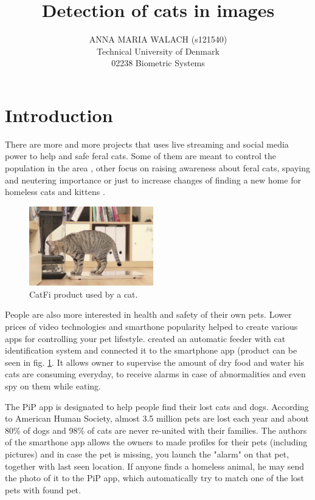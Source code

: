 \documentclass[hyperref]{acmtrans2e}
\title{Detection of cats in images}
\author{ANNA MARIA WALACH (s121540) \\Technical University of Denmark\\02238 Biometric Systems}
\begin{document}
\setcounter{page}{111}

\maketitle

\section{Introduction}
There are more and more projects that uses live streaming and social media power to help and safe feral cats. Some of them are meant to control the population in the area \cite{LAPS:2015}, other focus on raising awareness about feral cats, spaying and neutering importance \cite{TinyKittens:2015} or just to increase changes of finding a new home for homeless cats and kittens \cite{CritterRoom:2015}.
\begin{figure}
\centering
    \includegraphics[width=0.48\textwidth]{bistro}
  \caption{CatFi product used by a cat.}
  \label{fig:bistro}
\end{figure}

People are also more interested in health and safety of their own pets. Lower prices of video technologies and smarthone popularity helped to create various apps for controlling your pet lifestyle. \cite{CatFi:2015} created an automatic feeder with cat identification system and connected it to the smartphone app (product can be seen in fig. \ref{fig:bistro}. It allows owner to supervise the amount of dry food and water his cats are consuming everyday, to receive alarms in case of abnormalities and even spy on them while eating. 

The PiP \cite{PiP:2013} app is designated to help people find their lost cats and dogs. According to American Human Society, almost 3.5 million pets are lost each year and about 80\% of dogs and 98\% of cats are never re-united with their families. The authors of the smarthone app allows the owners to made profiles for their pets (including pictures) and in case the pet is missing, you launch the "alarm" on that pet, together with last seen location. If anyone finds a homeless animal, he may send the photo of it to the PiP app, which automatically try to match one of the lost pets with found pet. 
\end{document}
